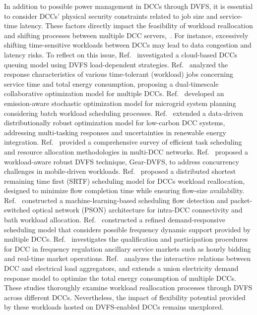 \documentclass[lettersize,journal]{IEEEtran}
\begin{document}
In addition to possible power management in DCCs through DVFS, it is essential to consider DCCs' physical security constraints related to job size and service-time latency. These factors directly impact the feasibility of workload reallocation and shifting processes between multiple DCC servers,~\cite{wang2020flexible}.
For instance, excessively shifting time-sensitive workloads between DCCs may lead to data congestion and latency risks. To reflect on this issue,
Ref.~\cite{kuehnDVFSpowerManagementPerformance2019} investigated a cloud-based DCCs queuing model using DVFS load-dependent strategies.
Ref.~\cite{hanDualtimeScaleCollaborative2025} analyzed the response characteristics of various time-tolerant (workload) jobs concerning service time and total energy consumption, proposing a dual-timescale collaborative optimization model for multiple DCCs.
Ref.~\cite{dingEmissionawareStochasticResource2018} developed an emission-aware stochastic optimization model for microgrid system planning considering batch workload scheduling processes.
Ref.~\cite{hanDatadrivenDistributionallyRobust2025} extended a data-driven distributionally robust optimization model for low-carbon DCC systems, addressing multi-tasking responses and uncertainties in renewable energy integration.
Ref.~\cite{wangClusterFrameworksEfficient2018} provided a comprehensive survey of efficient task scheduling and resource allocation methodologies in multi-DCC networks.
Ref.~\cite{lin2023workload} proposed a workload-aware robust DVFS technique, Gear-DVFS, to address concurrency challenges in mobile-driven workloads.
Ref.~\cite{8520806} proposed a distributed shortest remaining time first (SRTF) scheduling model for DCCs workload reallocation, designed to minimize flow completion time while ensuring flow-size availability.
Ref.~\cite{wangSchedulingMachineLearningBasedFlow2018} constructed a machine-learning-based scheduling flow detection and packet-switched optical network (PSON) architecture for intra-DCC connectivity and bath workload allocation.
Ref.~\cite{yu2023demand} constructed a refined demand-responsive scheduling model that considers possible frequency dynamic
	support provided by multiple DCCs.
	Ref.~\cite{Yu2024EnablingEnergyEfficientDataCenter} investigates the qualification and participation procedures for DCC in frequency regulation
	ancillary service markets such as hourly bidding and real-time market operations.
	Ref.~\cite{zhang2024data} analyzes the interactive relations between DCC and electrical load aggregators, and extends a union electricity demand
	response model to optimize the total energy consumption of multiple DCCs.
These studies thoroughly examine workload reallocation processes through DVFS across different DCCs. Nevertheless, the impact of flexibility potential
provided by these workloads hosted on DVFS-enabled DCCs remains unexplored.
\end{document}
